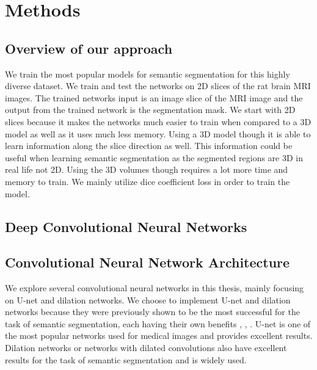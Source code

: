 \chapter{Methods}
%

\section{Overview of our approach}
We train the most popular models for semantic segmentation for this highly diverse dataset. 
We train and test the networks on 2D slices of the rat brain MRI images. 
The trained networks input is an image slice of the MRI image and the output from the trained network is the segmentation mask. 
We start with 2D slices because it makes the networks much easier to train when compared to a 3D model as well as it uses much less memory. 
Using a 3D model though it is able to learn information along the slice direction as well. 
This information could be useful when learning semantic segmentation as the segmented regions are 3D in real life not 2D. 
Using the 3D volumes though requires a lot more time and memory to train. 
We mainly utilize dice coefficient loss in order to train the model.

\section{Deep Convolutional Neural Networks}

\section{Convolutional Neural Network Architecture}
    We explore several convolutional neural networks in this thesis, mainly focusing on U-net and dilation networks. 
    We choose to implement U-net and dilation networks because they were previously shown to be the most successful for the task of semantic segmentation, each having their own benefits \cite{DBLP:journals/corr/LongSD14}, \cite{DBLP:journals/corr/RonnebergerFB15}, \cite{Yu2016MultiScaleCA}. 
    U-net is one of the most popular networks used for medical images and provides excellent results. 
    Dilation networks or networks with dilated convolutions also have excellent results for the task of semantic segmentation and is widely used. 

